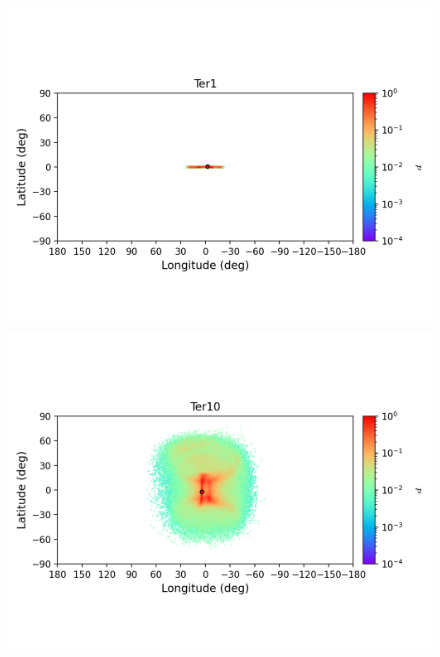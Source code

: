         \begin{figure}
            \begin{center}
                \includegraphics[clip=true, trim = 0mm 20mm 0mm 10mm, width=1\columnwidth]{images/error_plots_Ter1.png}
                \includegraphics[clip=true, trim = 0mm 20mm 0mm 10mm, width=1\columnwidth]{images/error_plots_Ter10.png}
                

\end{center}
\end{figure}
